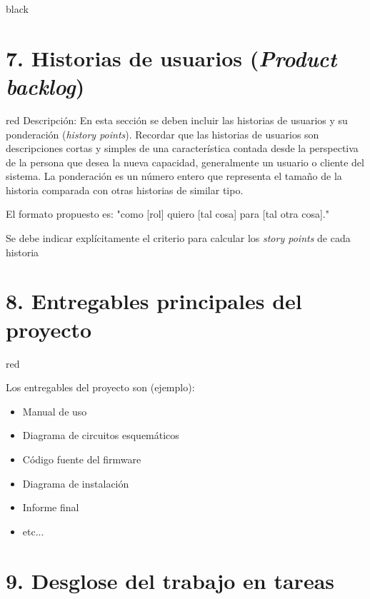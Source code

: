 \documentclass[
11pt, %
codirector, %
]{charter}
\begin{document}
\begin{consigna}{black}
\begin{enumerate}
\end{enumerate}

\end{consigna}

\section{7. Historias de usuarios (\textit{Product backlog})}
\label{sec:backlog}

\begin{consigna}{red}
Descripción: En esta sección se deben incluir las historias de usuarios y su ponderación (\textit{history points}). Recordar que las historias de usuarios son descripciones cortas y simples de una característica contada desde la perspectiva de la persona que desea la nueva capacidad, generalmente un usuario o cliente del sistema. La ponderación es un número entero que representa el tamaño de la historia comparada con otras historias de similar tipo.

El formato propuesto es: "como [rol] quiero [tal cosa] para [tal otra cosa]."

Se debe indicar explícitamente el criterio para calcular los \textit{story points} de cada historia
\end{consigna}

\section{8. Entregables principales del proyecto}
\label{sec:entregables}

\begin{consigna}{red}

Los entregables del proyecto son (ejemplo):

\begin{itemize}
	\item Manual de uso
	\item Diagrama de circuitos esquemáticos
	\item Código fuente del firmware
	\item Diagrama de instalación
	\item Informe final
	\item etc...
\end{itemize}

\end{consigna}

\section{9. Desglose del trabajo en tareas}
\label{sec:wbs}
\end{document}
